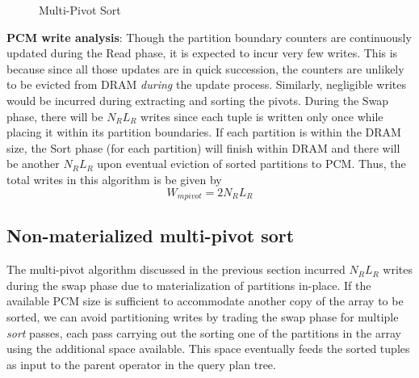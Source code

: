\begin{figure}[h]
	\centering
	\hspace{0mm}
    \hspace{0mm}
	\caption{Multi-Pivot Sort}
	\label{fig:mpsort}
	
\end{figure}
\textbf{PCM write analysis}: Though the partition boundary counters are continuously updated during the Read phase, it is expected to incur very few writes. This is because since all those updates are in quick succession, the counters are unlikely to be evicted from DRAM  \emph{during} the update process. Similarly, negligible writes would be incurred during extracting and sorting the pivots. During the Swap phase, there will be $N_R L_R$ writes since each tuple is written only once while placing it within its partition boundaries. If each partition is within the DRAM size, the Sort phase (for each partition) will finish within DRAM and there will be another $N_R L_R$ upon eventual eviction of sorted partitions to PCM.  Thus, the total writes in this algorithm is be given by 
\begin{equation}\label{eq:mpivot}
  W_{mpivot} = 2N_RL_R
\end{equation}

\subsection{Non-materialized multi-pivot sort}
The multi-pivot algorithm discussed in the previous section incurred $N_R L_R$ writes during the swap phase due to materialization of partitions in-place. If the available PCM size is sufficient to accommodate another copy of the array to be sorted, we can avoid partitioning writes by trading the swap phase for multiple \textit{sort} passes, each pass carrying out the sorting one of the partitions in the array using the additional space available. This space eventually feeds the sorted tuples as input to the parent operator in the query plan tree. 

